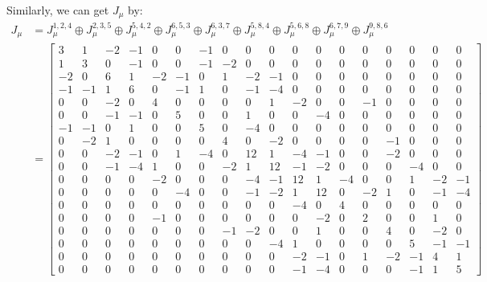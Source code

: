 \documentclass{article}
\begin{document}
Similarly, we can get $J_{\mu}$ by:
\begin{equation}
  \begin{aligned}
    J_{\mu} & = J^{1,2,4}_{\mu} \oplus J^{2,3,5}_{\mu} \oplus J^{5,4,2}_{\mu} \oplus J^{6,5,3}_{\mu} \oplus J^{6,3,7}_{\mu} \oplus J^{5,8,4}_{\mu} \oplus J^{5,6,8}_{\mu} \oplus J^{6,7,9}_{\mu} \oplus J^{9,8,6}_{\mu} \\
    & = \left[\begin{array}{cccccccccccccccccc}
          3 & 1 & -2 & -1 & 0 & 0 & -1 & 0 & 0 & 0 & 0 & 0 & 0 & 0 & 0 & 0 & 0 & 0 \\
          1 & 3 & 0 & -1 & 0 & 0 & -1 & -2 & 0 & 0 & 0 & 0 & 0 & 0 & 0 & 0 & 0 & 0 \\
          -2 & 0 & 6 & 1 & -2 & -1 & 0 & 1 & -2 & -1 & 0 & 0 & 0 & 0 & 0 & 0 & 0 & 0 \\
          -1 & -1 & 1 & 6 & 0 & -1 & 1 & 0 & -1 & -4 & 0 & 0 & 0 & 0 & 0 & 0 & 0 & 0 \\
          0 & 0 & -2 & 0 & 4 & 0 & 0 & 0 & 0 & 1 & -2 & 0 & 0 & -1 & 0 & 0 & 0 & 0 \\
          0 & 0 & -1 & -1 & 0 & 5 & 0 & 0 & 1 & 0 & 0 & -4 & 0 & 0 & 0 & 0 & 0 & 0 \\
          -1 & -1 & 0 & 1 & 0 & 0 & 5 & 0 & -4 & 0 & 0 & 0 & 0 & 0 & 0 & 0 & 0 & 0 \\
          0 & -2 & 1 & 0 & 0 & 0 & 0 & 4 & 0 & -2 & 0 & 0 & 0 & 0 & -1 & 0 & 0 & 0 \\
          0 & 0 & -2 & -1 & 0 & 1 & -4 & 0 & 12 & 1 & -4 & -1 & 0 & 0 & -2 & 0 & 0 & 0 \\
          0 & 0 & -1 & -4 & 1 & 0 & 0 & -2 & 1 & 12 & -1 & -2 & 0 & 0 & 0 & -4 & 0 & 0 \\
          0 & 0 & 0 & 0 & -2 & 0 & 0 & 0 & -4 & -1 & 12 & 1 & -4 & 0 & 0 & 1 & -2 & -1 \\
          0 & 0 & 0 & 0 & 0 & -4 & 0 & 0 & -1 & -2 & 1 & 12 & 0 & -2 & 1 & 0 & -1 & -4 \\
          0 & 0 & 0 & 0 & 0 & 0 & 0 & 0 & 0 & 0 & -4 & 0 & 4 & 0 & 0 & 0 & 0 & 0 \\
          0 & 0 & 0 & 0 & -1 & 0 & 0 & 0 & 0 & 0 & 0 & -2 & 0 & 2 & 0 & 0 & 1 & 0 \\
          0 & 0 & 0 & 0 & 0 & 0 & 0 & -1 & -2 & 0 & 0 & 1 & 0 & 0 & 4 & 0 & -2 & 0 \\
          0 & 0 & 0 & 0 & 0 & 0 & 0 & 0 & 0 & -4 & 1 & 0 & 0 & 0 & 0 & 5 & -1 & -1\\
          0 & 0 & 0 & 0 & 0 & 0 & 0 & 0 & 0 & 0 & -2 & -1 & 0 & 1 & -2 & -1 & 4 & 1 \\
          0 & 0 & 0 & 0 & 0 & 0 & 0 & 0 & 0 & 0 & -1 & -4 & 0 & 0 & 0 & -1 & 1 & 5
        \end{array}\right]\\
  \end{aligned}
\end{equation}
\end{document}
